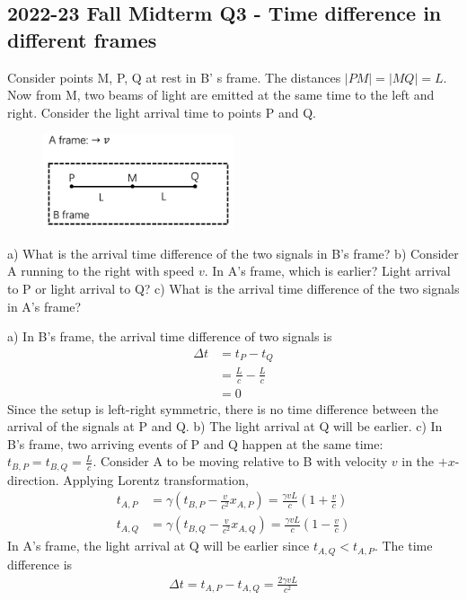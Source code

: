 \documentclass[12pt]{book} %
\numberwithin{equation}{chapter}
\def\c{\gamma}
\begin{document}
\subsection*{2022-23 Fall Midterm Q3 - Time difference in different frames}
Consider points M, P, Q at rest in B' s frame. The distances $|PM|=|MQ|=L$. Now from M, two beams of light are emitted at the same time to the left and right. Consider the light arrival time to points P and Q.
\begin{figure}[H]
    \centering
    \includegraphics[width=0.5\textwidth]{Time difference in different frames}
\end{figure}
\noindent a) What is the arrival time difference of the two signals in B's frame?\bigskip\newline
b) Consider A running to the right with speed $v$. In A's frame, which is earlier? Light arrival to P or light arrival to Q?\bigskip\newline
c) What is the arrival time difference of the two signals in A's frame?
\begin{solbox}
a) In B's frame, the arrival time difference of two signals is
\begin{align*}
\Delta t&= t_{P}-t_{Q}\\
&=\frac{L}{c}-\frac{L}{c}\\
&=0
\end{align*}
Since the setup is left-right symmetric, there is no time difference between the arrival of the signals at P and Q.\bigskip\newline
b) The light arrival at Q will be earlier.\bigskip\newline
c) In B's frame, two arriving events of P and Q happen at the same time: $t_{B, P}=t_{B, Q}=\frac{L}{c}$. Consider A to be moving relative to B with velocity $v$ in the $+x$-direction. Applying Lorentz transformation,
\begin{align*}
t_{A, P}&=\c\left(t_{B, P}-\frac{v}{c^2}x_{A, P}\right)=\frac{\c vL}{c}\left(1+\frac{v}{c}\right)\\
t_{A, Q}&=\c\left(t_{B, Q}-\frac{v}{c^2}x_{A, Q}\right)=\frac{\c vL}{c}\left(1-\frac{v}{c}\right)
\end{align*}
In A's frame, the light arrival at Q will be earlier since $t_{A,Q}<t_{A,P}$. The time difference is
\begin{align*}
\Delta t=t_{A,P}-t_{A,Q}=\frac{2\c vL}{c^2}
\end{align*}
\end{solbox}
\end{document}
